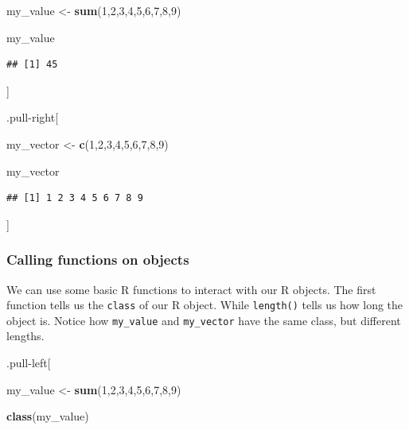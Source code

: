 \documentclass[
]{book}
\newenvironment{Shaded}{\begin{snugshade}}{\end{snugshade}}
\newcommand{\DecValTok}[1]{\textcolor[rgb]{0.00,0.00,0.81}{#1}}
\newcommand{\FunctionTok}[1]{\textcolor[rgb]{0.13,0.29,0.53}{\textbf{#1}}}
\newcommand{\NormalTok}[1]{#1}
\newcommand{\OtherTok}[1]{\textcolor[rgb]{0.56,0.35,0.01}{#1}}
\begin{document}
\begin{Shaded}
\begin{Highlighting}[]
\NormalTok{my\_value }\OtherTok{\textless{}{-}} \FunctionTok{sum}\NormalTok{(}\DecValTok{1}\NormalTok{,}\DecValTok{2}\NormalTok{,}\DecValTok{3}\NormalTok{,}\DecValTok{4}\NormalTok{,}\DecValTok{5}\NormalTok{,}\DecValTok{6}\NormalTok{,}\DecValTok{7}\NormalTok{,}\DecValTok{8}\NormalTok{,}\DecValTok{9}\NormalTok{)}

\NormalTok{my\_value}
\end{Highlighting}
\end{Shaded}

\begin{verbatim}
## [1] 45
\end{verbatim}

{]}

.pull-right{[}

\begin{Shaded}
\begin{Highlighting}[]
\NormalTok{my\_vector }\OtherTok{\textless{}{-}} \FunctionTok{c}\NormalTok{(}\DecValTok{1}\NormalTok{,}\DecValTok{2}\NormalTok{,}\DecValTok{3}\NormalTok{,}\DecValTok{4}\NormalTok{,}\DecValTok{5}\NormalTok{,}\DecValTok{6}\NormalTok{,}\DecValTok{7}\NormalTok{,}\DecValTok{8}\NormalTok{,}\DecValTok{9}\NormalTok{)}

\NormalTok{my\_vector}
\end{Highlighting}
\end{Shaded}

\begin{verbatim}
## [1] 1 2 3 4 5 6 7 8 9
\end{verbatim}

{]}

\hypertarget{calling-functions-on-objects}{%
\subsubsection{Calling functions on objects}\label{calling-functions-on-objects}}

We can use some basic R functions to interact with our R objects. The first function tells us the \texttt{class} of our R object. While \texttt{length()} tells us how long the object is. Notice how \texttt{my\_value} and \texttt{my\_vector} have the same class, but different lengths.

.pull-left{[}

\begin{Shaded}
\begin{Highlighting}[]
\NormalTok{my\_value }\OtherTok{\textless{}{-}} \FunctionTok{sum}\NormalTok{(}\DecValTok{1}\NormalTok{,}\DecValTok{2}\NormalTok{,}\DecValTok{3}\NormalTok{,}\DecValTok{4}\NormalTok{,}\DecValTok{5}\NormalTok{,}\DecValTok{6}\NormalTok{,}\DecValTok{7}\NormalTok{,}\DecValTok{8}\NormalTok{,}\DecValTok{9}\NormalTok{)}

\FunctionTok{class}\NormalTok{(my\_value)}
\end{Highlighting}
\end{Shaded}
\end{document}
